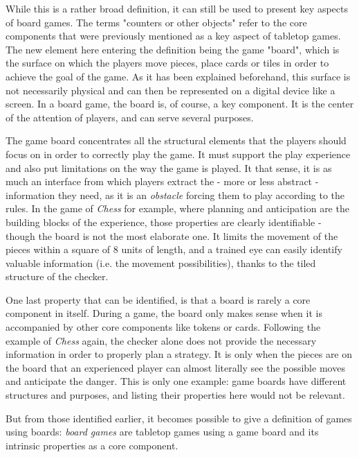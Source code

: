 While this is a rather broad definition, it can still be used to present key aspects of board games. The terms "counters or other objects" refer to the core components that were previously mentioned as a key aspect of tabletop games. The new element here entering the definition being the game "board", which is the surface on which the players move pieces, place cards or tiles in order to achieve the goal of the game. As it has been explained beforehand, this surface is not necessarily physical and can then be represented on a digital device like a screen. In a board game, the board is, of course, a key component. It is the center of the attention of players, and can serve several purposes.

The game board concentrates all the structural elements that the players should focus on in order to correctly play the game. It must support the play experience and also put limitations on the way the game is played. It that sense, it is as much an interface from which players extract the - more or less abstract - information they need, as it is an \textit{obstacle} forcing them to play according to the rules. 
In the game of \textit{Chess} for example, where planning and anticipation are the building blocks of the experience, those properties are clearly identifiable - though the board is not the most elaborate one. It limits the movement of the pieces within a square of 8 units of length, and a trained eye can easily identify valuable information (i.e. the movement possibilities), thanks to the tiled structure of the checker. 

One last property that can be identified, is that a board is rarely a core component in itself. During a game, the board only makes sense when it is accompanied by other core components like tokens or cards. Following the example of \textit{Chess} again, the checker alone does not provide the necessary information in order to properly plan a strategy. It is only when the pieces are on the board that an experienced player can almost literally see the possible moves and anticipate the danger. 
This is only one example: game boards have different structures and purposes, and listing their properties here would not be relevant. 

But from those identified earlier, it becomes possible to give a definition of games using boards: \textit{board games} are tabletop games using a game board and its intrinsic properties as a core component.

